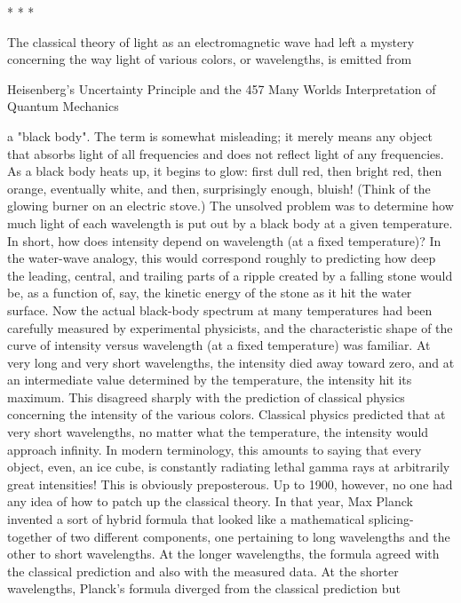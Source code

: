                                         *   *   *

       The classical theory of light as an electromagnetic wave had left a mystery
concerning the way light of various colors, or wavelengths, is emitted from




Heisenberg's Uncertainty Principle and the                                            457
Many Worlds Interpretation of Quantum Mechanics

a "black body". The term is somewhat misleading; it merely means any object that
absorbs light of all frequencies and does not reflect light of any frequencies. As a
black body heats up, it begins to glow: first dull red, then bright red, then orange,
eventually white, and then, surprisingly enough, bluish! (Think of the glowing burner
on an electric stove.) The unsolved problem was to determine how much light of each
wavelength is put out by a black body at a given temperature. In short, how does
intensity depend on wavelength (at a fixed temperature)? In the water-wave analogy,
this would correspond roughly to predicting how deep the leading, central, and
trailing parts of a ripple created by a falling stone would be, as a function of, say, the
kinetic energy of the stone as it hit the water surface.
        Now the actual black-body spectrum at many temperatures had been carefully
measured by experimental physicists, and the characteristic shape of the curve of
intensity versus wavelength (at a fixed temperature) was familiar. At very long and
very short wavelengths, the intensity died away toward zero, and at an intermediate
value determined by the temperature, the intensity hit its maximum. This disagreed
sharply with the prediction of classical physics concerning the intensity of the various
colors. Classical physics predicted that at very short wavelengths, no matter what the
temperature, the intensity would approach infinity. In modern terminology, this
amounts to saying that every object, even, an ice cube, is constantly radiating lethal
gamma rays at arbitrarily great intensities! This is obviously preposterous. Up to
1900, however, no one had any idea of how to patch up the classical theory.
        In that year, Max Planck invented a sort of hybrid formula that looked like a
mathematical splicing-together of two different components, one pertaining to long
wavelengths and the other to short wavelengths. At the longer wavelengths, the
formula agreed with the classical prediction and also with the measured data. At the
shorter wavelengths, Planck's formula diverged from the classical prediction but
